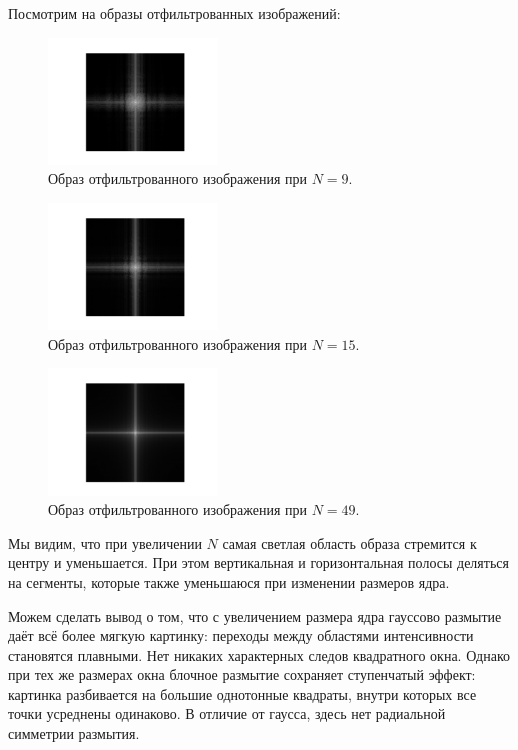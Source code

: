 \documentclass[a4paper]{article}
\begin{document}
Посмотрим на образы отфильтрованных изображений:
\begin{figure}[H]
  \centering
  \includegraphics[width=0.4\textwidth]{src/ifft_spec_box_9.png}
  \caption{Образ отфильтрованного изображения при $N=9$.}
\end{figure}
\begin{figure}[H]
  \centering
  \includegraphics[width=0.4\textwidth]{src/ifft_spec_box_15.png}
  \caption{Образ отфильтрованного изображения при $N=15$.}
\end{figure}
\begin{figure}[H]
  \centering
  \includegraphics[width=0.4\textwidth]{src/ifft_spec_box_49.png}
  \caption{Образ отфильтрованного изображения при $N=49$.}
\end{figure}

\noindent Мы видим, что при увеличении $N$ самая светлая область образа стремится к центру и уменьшается. При этом вертикальная и горизонтальная полосы деляться на сегменты, которые также уменьшаюся при изменении размеров ядра.

Можем сделать вывод о том, что с увеличением размера ядра гауссово размытие даёт всё более мягкую картинку: переходы между областями интенсивности становятся плавными. Нет никаких характерных следов квадратного окна. Однако при тех же размерах окна блочное размытие сохраняет ступенчатый эффект: картинка разбивается на большие однотонные квадраты, внутри которых все точки усреднены одинаково. В отличие от гаусса, здесь нет радиальной симметрии размытия.
\end{document}
